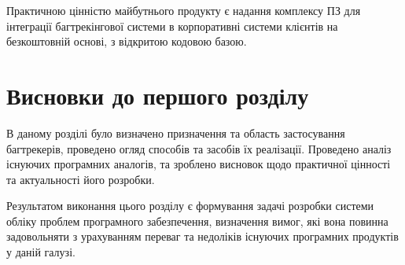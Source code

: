 \documentclass[../main.tex]{subfiles}
\begin{document}
Практичною цінністю майбутнього продукту є надання комплексу ПЗ для інтеграції багтрекінгової системи в корпоративні системи клієнтів на безкоштовній основі, з відкритою кодовою базою.

\section{Висновки до першого розділу}
В даному розділі було визначено призначення та область застосування багтрекерів, проведено огляд способів та засобів їх реалізації. Проведено аналіз існуючих програмних аналогів, та зроблено висновок щодо практичної цінності та актуальності його розробки.

Результатом виконання цього розділу є формування задачі розробки системи обліку проблем програмного забезпечення, визначення вимог, які вона повинна задовольняти з урахуванням переваг та недоліків існуючих програмних продуктів у даній галузі.
\end{document}
